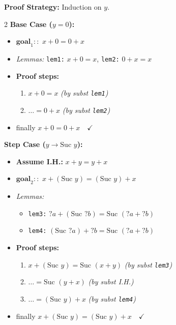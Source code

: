 \documentclass[10pt,a4paper]{article}
\begin{document}
\vspace{0.3em}

\begin{tcolorbox}[title={Detailed Example: Commutativity of Addition ($?x + ?y = ?y + ?x$)}]
\textbf{Proof Strategy:} Induction on $y$.

\begin{multicols}{2}
\textbf{Base Case ($y = 0$):}
\begin{itemize}[leftmargin=1.2em, itemsep=2pt]
    \item $\textbf{goal}_1::$ $x + 0 = 0 + x$
    \item \textit{Lemmas:} \texttt{lem1:} $x + 0 = x$, \quad \texttt{lem2:} $0 + x = x$
    \item \textbf{Proof steps:}
    \begin{enumerate}[leftmargin=1.2em, itemsep=1pt]
        \item $x + 0 = x$ \quad \textit{(by subst \texttt{lem1})}
        \item $\dots = 0 + x$ \quad \textit{(by subst \texttt{lem2})}
    \end{enumerate}
    \item \textsf{finally} $x + 0 = 0 + x \quad \checkmark$
\end{itemize}

\columnbreak

\textbf{Step Case ($y \to \text{Suc } y$):}
\begin{itemize}[leftmargin=1.2em, itemsep=2pt]
    \item \textbf{Assume I.H.:} $x + y = y + x$
    \item $\textbf{goal}_2::$ $x + (\text{Suc } y) = (\text{Suc } y) + x$
    \item \textit{Lemmas:}
    \begin{itemize}[leftmargin=1em, label=$\bullet$]
        \item \texttt{lem3:} $?a + (\text{Suc } ?b) = \text{Suc } (?a + ?b)$
        \item \texttt{lem4:} $(\text{Suc } ?a) + ?b = \text{Suc } (?a + ?b)$
    \end{itemize}
    \item \textbf{Proof steps:}
    \begin{enumerate}[leftmargin=1.2em, itemsep=1pt]
        \item $x + (\text{Suc } y) = \text{Suc } (x + y)$ \quad \textit{(by subst \texttt{lem3})}
        \item $\dots = \text{Suc } (y + x)$ \quad \textit{(by subst \textsf{I.H.})}
        \item $\dots = (\text{Suc } y) + x$ \quad \textit{(by subst \texttt{lem4})}
    \end{enumerate}
    \item \textsf{finally} $x + (\text{Suc } y) = (\text{Suc } y) + x \quad \checkmark$
\end{itemize}
\end{multicols}
\end{tcolorbox}
\end{document}
